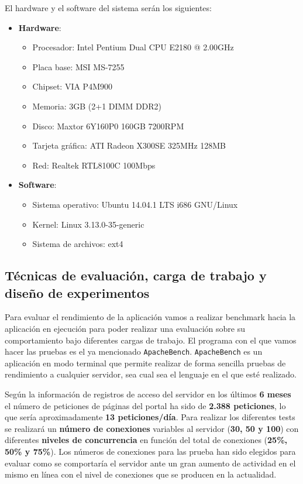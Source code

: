 El hardware y el software del sistema serán los siguientes:

\begin{itemize}
	\item \textbf{Hardware}:
	\begin{itemize}
		\item Procesador: Intel Pentium Dual CPU E2180 @ 2.00GHz
		\item Placa base: MSI MS-7255
		\item Chipset: VIA P4M900
		\item Memoria: 3GB (2+1 DIMM DDR2)
		\item Disco: Maxtor 6Y160P0 160GB 7200RPM
		\item Tarjeta gráfica: ATI Radeon X300SE 325MHz 128MB
		\item Red: Realtek RTL8100C 100Mbps
	\end{itemize}
	\item \textbf{Software}:
	\begin{itemize}
		\item Sistema operativo: Ubuntu 14.04.1 LTS i686 GNU/Linux
		\item Kernel: Linux 3.13.0-35-generic
		\item Sistema de archivos: ext4
	\end{itemize}
\end{itemize}

\subsection{Técnicas de evaluación, carga de trabajo y diseño de experimentos}

Para evaluar el rendimiento de la aplicación vamos a realizar benchmark hacia la aplicación en ejecución para poder realizar una evaluación sobre su comportamiento bajo diferentes cargas de trabajo. El programa con el que vamos hacer las pruebas es el ya mencionado {\tt ApacheBench}.
{\tt ApacheBench} es un aplicación en modo terminal que permite realizar de forma sencilla pruebas de rendimiento a cualquier servidor, sea cual sea el lenguaje en el que esté realizado. 

\bigskip
Según la información de registros de acceso del servidor en los últimos \textbf{6 meses} el número de peticiones de páginas del portal ha sido de \textbf{2.388 peticiones}, lo que sería aproximadamente \textbf{13 peticiones/día}. Para realizar los diferentes tests se realizará un \textbf{número de conexiones} variables al servidor (\textbf{30, 50 y 100}) con diferentes \textbf{niveles de concurrencia} en función del total de conexiones (\textbf{25\%, 50\% y 75\%}). Los números de conexiones para las prueba han sido elegidos para evaluar como se comportaría el servidor ante un gran aumento de actividad en el mismo en línea con el nivel de conexiones que se producen en la actualidad.

